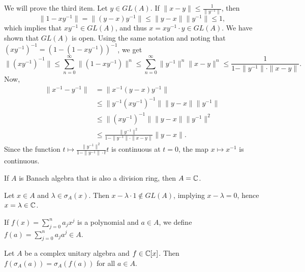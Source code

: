 \begin{myproof}
  We will prove the third item. Let $y \in GL (A)$. If $\|x - y\| \leq \frac{1}{\|y^{-1}\|}$, 
  then $$\| 1 - xy^{-1}\| = \| (y - x) y^{-1}\| \leq \| y - x\| \|y^{-1}\| \leq 1,$$
  which implies that $xy^{-1} \in GL (A)$, and thus $x = xy^{-1} \cdot y \in GL (A)$. We have shown that $GL(A)$ is open.
  Using the same notation and noting that $(xy^{-1})^{-1} = (1-(1 - xy^{-1}))^{-1}$, we get 
  $$\|(xy^{-1})^{-1}\| \leq \sum_{n = 0} ^\infty \| (1 - xy^{-1}) \|^n \leq \sum_{n = 0} ^\infty \| y^{-1} \|^n \|x - y \|^n \leq \frac{1}{1 - \|y^{-1}\| \cdot \|x - y\|}.$$
  Now,
  \begin{align*}
    \| x^{-1} - y^{-1}\| &= \| x^{-1} (y - x) y^{-1}\| \\
    &\leq \| y^{-1} (xy^{-1})^{-1}\| \| y - x\| \| y^{-1}\|\\
    &\leq \|(xy^{-1})^{-1}\| \| y - x\| \| y^{-1}\|^2\\
    &\leq \frac{\| y^{-1}\|^2}{1 - \|y^{-1}\| \cdot \|x - y\|} \| y - x\|.
  \end{align*}
  Since the function $t \mapsto \frac{\| y^{-1}\|^2}{1 - \|y^{-1}\| \cdot t} t$ is continuous at $t = 0$, the map $x \mapsto x^{-1}$ is continuous.
\end{myproof}

\begin{theorem}
  If $A$ is Banach algebra that is also a division ring, then $A = \mathbb {C}$.
\end{theorem}

\begin{myproof}
  Let $x \in A$ and $\lambda \in \sigma_A (x)$. Then $x - \lambda \cdot 1 \notin GL(A)$, implying
  $x - \lambda = 0$, hence $x = \lambda \in \mathbb {C}$.
\end{myproof}

\begin{definition}
  If $f(x) = \sum_{j = 0} ^n a_j x^j$ is a polynomial and $a \in A$, we define 
  $f(a) = \sum _{j = 0} ^n a_j a^j \in A$.
\end{definition}

\begin{theorem}
  Let $A$ be a complex unitary algebra and $f \in \mathbb {C} [x]$. Then $f(\sigma_A (a)) = \sigma_A (f(a))$
  for all $a \in A$.
\end{theorem}

